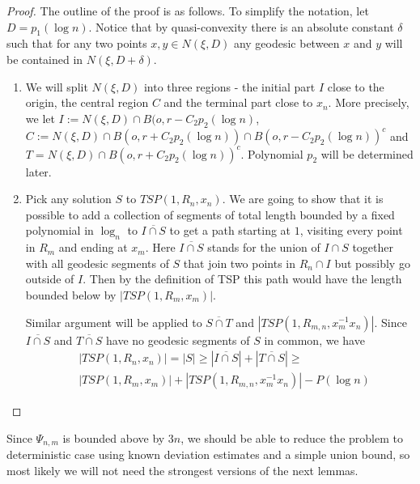 \begin{proof}
The outline of the proof is as follows.
To simplify the notation, let $D=p_1(\log n)$. Notice that by quasi-convexity  there is an absolute constant $\delta$ such that for any two points $x,y \in N(\xi, D)$ any geodesic between $x$ and $y$ will be contained in $N(\xi,D+\delta)$.  



\begin{enumerate}
    \item  We will split $N(\xi, D)$ into three regions - the initial part $I$ close to the origin, the central region $C$ and the terminal part close to $x_n$.  More precisely,  we let $I:=N(\xi, D)\cap B(o, r - C_2 p_2(\log n)$, $C:= N(\xi,D) \cap B(o,r+C_2 p_2(\log n)) \cap B(o, r - C_2 p_2(\log n))^c$ and $T=N(\xi,D) \cap B(o, r + C_2 p_2(\log n))^c$. Polynomial $p_2$ will be determined later.
    
    \item  
    Pick any solution $S$ to  $TSP(1,R_n,x_n)$.  We are going to show that it is possible to add a collection of segments of total length bounded by a fixed polynomial in $\log_n$ to $\overline{I \cap S}$  to get a path starting at $1$, visiting every point in $R_m$ and ending at $x_m$.  Here  $\overline{I \cap S}$ stands for the union of $I \cap S$  together with all geodesic segments of $S$ that join two points in $R_n  \cap I $  but possibly go outside of $I$. Then by the definition of TSP this path would have the length bounded below by $|TSP(1,R_m,x_m)|$.  
    
    Similar argument will be applied to $\overline{S \cap T}$ and $|TSP(1,R_{m,n}, x_m^{-1} x_n)|$. Since $\overline{I \cap S}$ and $\overline{T \cap S}$ have no geodesic segments of $S$ in common,  we have  
    \begin{align*}
    &|TSP(1,R_n,x_n)|= |S| \ge |\overline{I \cap S}|+|\overline{T \cap S}| \ge \\ 
     &|TSP(1,R_m,x_m)| +
      |TSP(1,R_{m,n}, x_m^{-1} x_n)| -P(\log n)
    \end{align*}
\end{enumerate}
\end{proof}


Since $\Psi_{n,m}$ is bounded above by $3n$, we should be able to reduce the problem to deterministic case using  known deviation estimates and a simple union bound, so most likely we will not need the strongest versions of the next lemmas.

